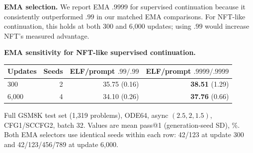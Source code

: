 \documentclass{article}
\newenvironment{revision}{\begingroup\color{blue}}{\endgroup}
\newcommand{\reviewcolor}{\color{blue}}
\begin{document}
\begin{revision}
\noindent\begin{minipage}{\linewidth}\reviewcolor
\textbf{EMA selection.} We report EMA $.9999$ for supervised continuation because it consistently outperformed $.99$ in our matched EMA comparisons. For NFT-like continuation, this holds at both 300 and 6,000 updates; using $.99$ would increase NFT's measured advantage.

\begin{center}\small
\textbf{EMA sensitivity for NFT-like supervised continuation.}\par\smallskip
\begin{tabular}{@{}lrrr@{}}\toprule
Updates & Seeds & ELF/prompt $.99/.99$ & ELF/prompt $.9999/.9999$\\\midrule
300 & 2 & 35.75 (0.16) & \textbf{38.51} (1.29)\\
6,000 & 4 & 34.10 (0.26) & \textbf{37.76} (0.66)\\\bottomrule
\end{tabular}
\par\smallskip
\parbox{\linewidth}{\footnotesize Full GSM8K test set (1,319 problems), ODE64, async $(2.5,2,1.5)$, CFG1/SCCFG2, batch 32. Values are mean pass@1 (generation-seed SD), \%. Both EMA selectors use identical seeds within each row: 42/123 at update 300 and 42/123/456/789 at update 6,000.}
\end{center}
\end{minipage}

\end{revision}
\end{document}

